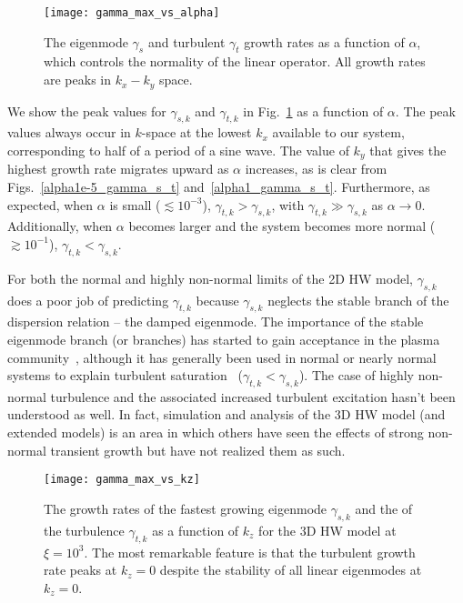 \documentclass[letter,scriptaddress,twocolumn, prl,showkeys]{revtex4}
\begin{document}
\begin{figure}
\centerline{\texttt{[image: gamma\_max\_vs\_alpha]}}
\caption{The eigenmode $\gamma_{s}$ and turbulent $\gamma_{t}$ growth rates as a function of $\alpha$, which controls the normality of the linear operator. All growth rates are peaks in $k_x-k_y$ space.}
\label{gamma_max_vs_alpha}
\end{figure}

We show the peak values for $\gamma_{s,k}$ and $\gamma_{t,k}$ in Fig.~\ref{gamma_max_vs_alpha} as a function of $\alpha$. The peak values always occur in $k$-space
at the lowest $k_x$ available to our system, corresponding to half of a period of a sine wave. The value of $k_y$ that gives the highest growth rate migrates upward as $\alpha$ increases,
as is clear from Figs.~\ref{alpha1e-5_gamma_s_t} and~\ref{alpha1_gamma_s_t}. Furthermore, as expected, when $\alpha$ is small ($\lesssim 10^{-3}$), $\gamma_{t,k} > \gamma_{s,k}$, with
$\gamma_{t,k} \gg \gamma_{s,k}$ as $\alpha \to 0$. Additionally, when $\alpha$ becomes larger and the system becomes more normal ($\gtrsim 10^{-1}$), $\gamma_{t,k} < \gamma_{s,k}$.

For both the normal and highly non-normal limits of the 2D HW model, $\gamma_{s,k}$ does a poor job of predicting $\gamma_{t,k}$ because $\gamma_{s,k}$ neglects the stable branch of the
dispersion relation -- the damped eigenmode. The importance of the stable eigenmode branch (or branches) 
has started to gain acceptance in the plasma community~\cite{baver2002}, although it has generally been used in normal
or nearly normal systems to explain turbulent saturation~\cite{terry2006b,hatch2011,makwana2011} ($\gamma_{t,k} < \gamma_{s,k}$). 
The case of highly non-normal turbulence and the associated increased turbulent excitation
hasn't been understood as well. In fact, simulation and analysis of the 3D HW model (and extended models) is an area in which others have seen the effects of strong non-normal transient growth
but have not realized them as such.


\begin{figure}
\centerline{\texttt{[image: gamma\_max\_vs\_kz]}}
\caption{The growth rates of the fastest growing eigenmode $\gamma_{s,k}$ and the of the turbulence $\gamma_{t,k}$ as a function of $k_z$ for the 3D HW model at $\xi = 10^3$. The most remarkable feature is
that the turbulent growth rate peaks at $k_z=0$ despite the stability of all linear eigenmodes at $k_z=0$.}
\label{gamma_max_vs_kz}
\end{figure}
\end{document}
